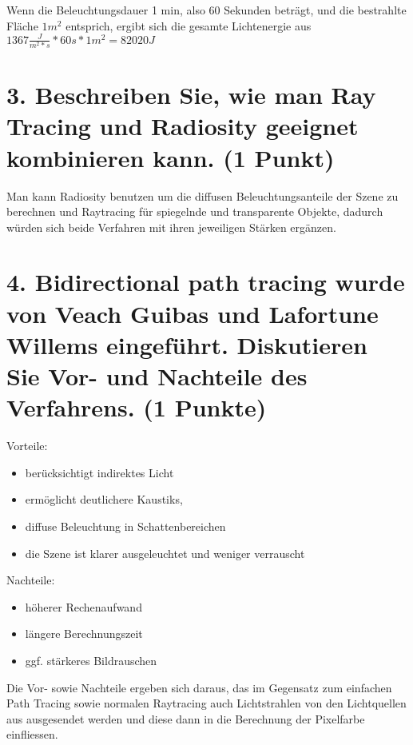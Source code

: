 \documentclass[12pt]{scrreprt}
\begin{document}
Wenn die Beleuchtungsdauer 1 min, also 60 Sekunden beträgt, und die bestrahlte Fläche $1 m^2$ entsprich, ergibt sich die gesamte Lichtenergie aus $1367 \frac{J}{m^2 * s} * 60 s * 1 m^2 = 82020 J$


\section*{3. Beschreiben Sie, wie man Ray Tracing und Radiosity geeignet kombinieren kann. (1 Punkt)}

Man kann Radiosity benutzen um die diffusen Beleuchtungsanteile der Szene zu berechnen und Raytracing für spiegelnde und transparente Objekte, dadurch würden sich beide Verfahren mit ihren jeweiligen Stärken ergänzen.


\section*{4. Bidirectional path tracing wurde von Veach Guibas und Lafortune Willems eingeführt. Diskutieren Sie Vor- und Nachteile des Verfahrens. (1 Punkte)}

Vorteile:

\begin{itemize}
  \item berücksichtigt indirektes Licht
  \item ermöglicht deutlichere Kaustiks,
  \item diffuse Beleuchtung in Schattenbereichen
  \item die Szene ist klarer ausgeleuchtet und weniger verrauscht
\end{itemize}

Nachteile:

\begin{itemize}
  \item höherer Rechenaufwand
  \item längere Berechnungszeit
  \item ggf. stärkeres Bildrauschen
\end{itemize}

Die Vor- sowie Nachteile ergeben sich daraus, das im Gegensatz zum einfachen Path Tracing sowie normalen Raytracing auch Lichtstrahlen von den Lichtquellen aus ausgesendet werden und diese dann in die Berechnung der Pixelfarbe einfliessen.
\end{document}
